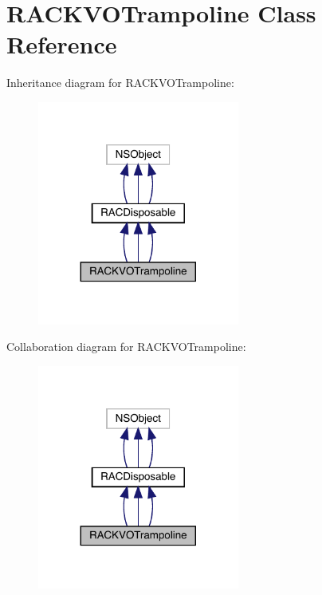 \hypertarget{interface_r_a_c_k_v_o_trampoline}{}\section{R\+A\+C\+K\+V\+O\+Trampoline Class Reference}
\label{interface_r_a_c_k_v_o_trampoline}


Inheritance diagram for R\+A\+C\+K\+V\+O\+Trampoline\+:\nopagebreak
\begin{figure}[H]
\begin{center}
\leavevmode
\includegraphics[width=188pt]{interface_r_a_c_k_v_o_trampoline__inherit__graph}
\end{center}
\end{figure}


Collaboration diagram for R\+A\+C\+K\+V\+O\+Trampoline\+:\nopagebreak
\begin{figure}[H]
\begin{center}
\leavevmode
\includegraphics[width=188pt]{interface_r_a_c_k_v_o_trampoline__coll__graph}
\end{center}
\end{figure}
